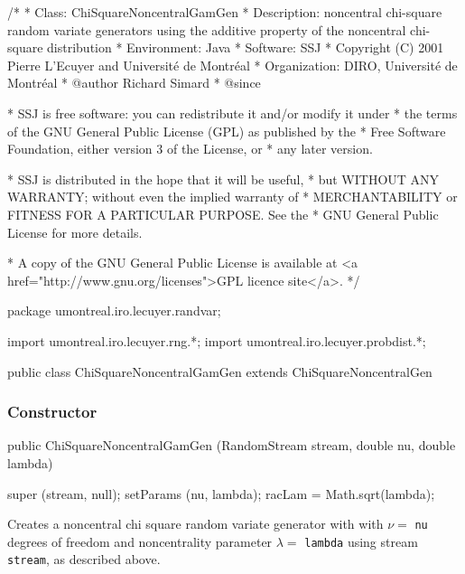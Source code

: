 \begin{code}
\begin{hide}
/*
 * Class:        ChiSquareNoncentralGamGen
 * Description:  noncentral chi-square random variate generators using the
                 additive property of the noncentral chi-square distribution
 * Environment:  Java
 * Software:     SSJ 
 * Copyright (C) 2001  Pierre L'Ecuyer and Université de Montréal
 * Organization: DIRO, Université de Montréal
 * @author       Richard Simard
 * @since

 * SSJ is free software: you can redistribute it and/or modify it under
 * the terms of the GNU General Public License (GPL) as published by the
 * Free Software Foundation, either version 3 of the License, or
 * any later version.

 * SSJ is distributed in the hope that it will be useful,
 * but WITHOUT ANY WARRANTY; without even the implied warranty of
 * MERCHANTABILITY or FITNESS FOR A PARTICULAR PURPOSE.  See the
 * GNU General Public License for more details.

 * A copy of the GNU General Public License is available at
   <a href="http://www.gnu.org/licenses">GPL licence site</a>.
 */
\end{hide}
package umontreal.iro.lecuyer.randvar;\begin{hide}
import umontreal.iro.lecuyer.rng.*;
import umontreal.iro.lecuyer.probdist.*;
\end{hide}

public class ChiSquareNoncentralGamGen extends ChiSquareNoncentralGen \begin{hide} {
   private double racLam = -1.0;

\end{hide}\end{code}

\subsubsection* {Constructor}

\begin{code}

   public ChiSquareNoncentralGamGen (RandomStream stream,
                                     double nu, double lambda) \begin{hide} {
      super (stream, null);
      setParams (nu, lambda);
      racLam = Math.sqrt(lambda);
   }\end{hide}
\end{code} 
\begin{tabb}  Creates a noncentral chi square random variate generator with 
 with $\nu = $ \texttt{nu} degrees of freedom and noncentrality parameter
$\lambda = $ \texttt{lambda} using stream \texttt{stream}, as described above. 
\end{tabb}


